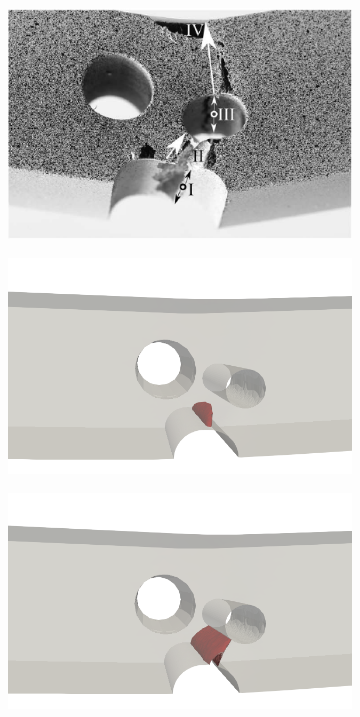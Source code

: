 \begin{frame}
\begin{columns}[T]
\begin{column}{0.6\textwidth}
\begin{figure}
        \begin{subfigure}{0.33\textwidth}
          \centering
          \includegraphics[width=\textwidth,scale=0.5]{Chapter345/figures/1234}
        \end{subfigure}
        \hfill
        \begin{minipage}{0.6\textwidth}
          \begin{subfigure}{0.45\textwidth}
            \centering
            \includegraphics[width=\linewidth]{Chapter345/figures/I}
          \end{subfigure}
          \begin{subfigure}{0.45\textwidth}
            \centering
            \includegraphics[width=\linewidth]{Chapter345/figures/II}

\end{subfigure}
\end{minipage}
\end{figure}
\end{column}
\end{columns}
\end{frame}
